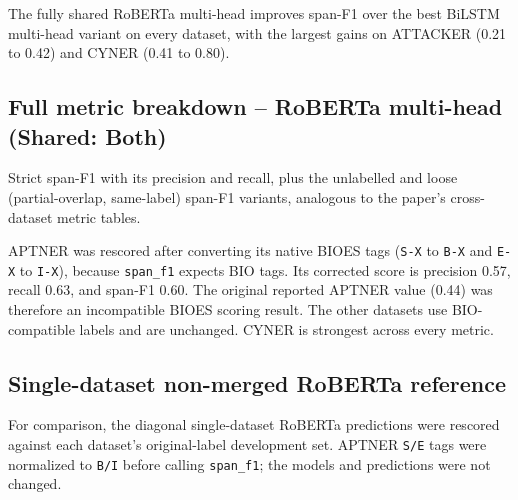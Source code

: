 The fully shared RoBERTa multi-head improves span-F1 over the best BiLSTM multi-head variant on every dataset, with the largest gains on ATTACKER (0.21 to 0.42) and CYNER (0.41 to 0.80).

\subsection*{Full metric breakdown -- RoBERTa multi-head (Shared: Both)}

Strict span-F1 with its precision and recall, plus the unlabelled and loose (partial-overlap, same-label) span-F1 variants, analogous to the paper's cross-dataset metric tables.

\begin{table}[h!]
\centering
{}%
\caption{Full metric breakdown for the RoBERTa multi-head model.}
\label{tab:multihead_roberta_metrics}
\end{table}

APTNER was rescored after converting its native BIOES tags (\texttt{S-X} to \texttt{B-X} and \texttt{E-X} to \texttt{I-X}), because \texttt{span\_f1} expects BIO tags. Its corrected score is precision 0.57, recall 0.63, and span-F1 0.60. The original reported APTNER value (0.44) was therefore an incompatible BIOES scoring result. The other datasets use BIO-compatible labels and are unchanged. CYNER is strongest across every metric.

\subsection*{Single-dataset non-merged RoBERTa reference}

For comparison, the diagonal single-dataset RoBERTa predictions were rescored against each dataset's original-label development set. APTNER \texttt{S/E} tags were normalized to \texttt{B/I} before calling \texttt{span\_f1}; the models and predictions were not changed.

